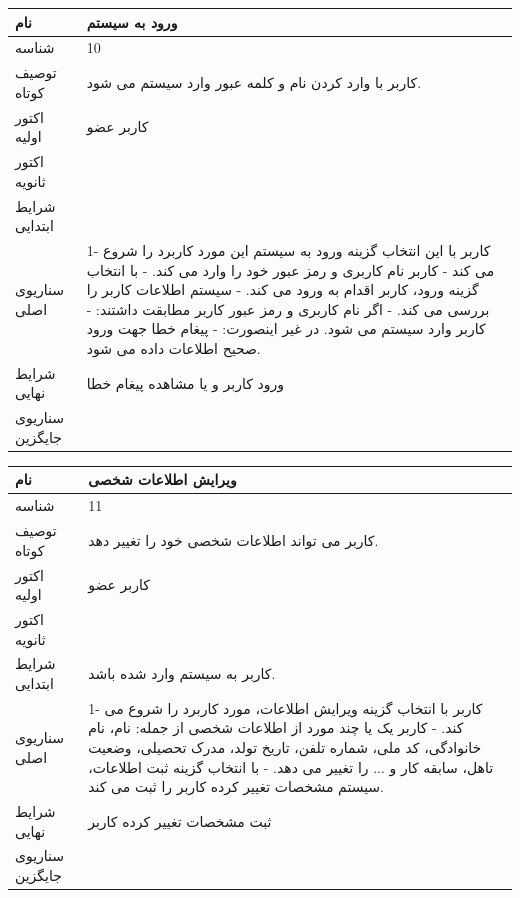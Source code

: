 \documentclass{article}
\begin{document}
\begin{tabular}{|p{2cm}|p{10cm}|}
\hline
نام
&
ورود به سیستم
\\
\hline
شناسه
&
10
\\
\hline
توصیف کوتاه
&
کاربر با وارد کردن نام و کلمه عبور وارد سیستم می شود.
\\
\hline
اکتور اولیه
&
کاربر عضو
\\
\hline
اکتور ثانویه
&

\\
\hline
شرایط ابتدایی
&

\\
\hline
سناریوی اصلی
&
1- کاربر با این انتخاب گزینه ورود به سیستم این مورد کاربرد را شروع می کند
\newline
2- کاربر نام کاربری و رمز عبور خود را وارد می کند.
\newline
3- با انتخاب گزینه ورود، کاربر اقدام به ورود می کند.
\newline
4- سیستم اطلاعات کاربر را بررسی می کند.
\newline
5- اگر نام کاربری و رمز عبور کاربر مطابقت داشتند:
\newline
5.1- کاربر وارد سیستم می شود.
\newline
در غیر اینصورت:
\newline
5.2- پیغام خطا جهت ورود صحیح اطلاعات داده می شود.
\\
\hline
شرایط نهایی
&
ورود کاربر و یا مشاهده پیغام خطا
\\
\hline
سناریوی جایگزین
&

\\
\hline
\end{tabular}

\vspace{2cm}


\begin{tabular}{|p{2cm}|p{10cm}|}
\hline
نام
&
ویرایش اطلاعات شخصی
\\
\hline
شناسه
&
11
\\
\hline
توصیف کوتاه
&
کاربر می تواند اطلاعات شخصی خود را تغییر دهد.
\\
\hline
اکتور اولیه
&
کاربر عضو
\\
\hline
اکتور ثانویه
&

\\
\hline
شرایط ابتدایی
&
کاربر به سیستم وارد شده باشد.
\\
\hline
سناریوی اصلی
&
1- کاربر با انتخاب گزینه ویرایش اطلاعات، مورد کاربرد را شروع می کند.
\newline
2- کاربر یک یا چند مورد از اطلاعات شخصی از جمله: نام، نام خانوادگی، کد ملی، شماره تلفن، تاریخ تولد، مدرک تحصیلی، وضعیت تاهل، سابقه کار و ... را تغییر می دهد.
\newline
3- با انتخاب گزینه ثبت اطلاعات، سیستم مشخصات تغییر کرده کاربر را ثبت می کند. 
\\
\hline
شرایط نهایی
&
ثبت مشخصات تغییر کرده کاربر
\\
\hline
سناریوی جایگزین
&

\\
\hline
\end{tabular}
\end{document}

